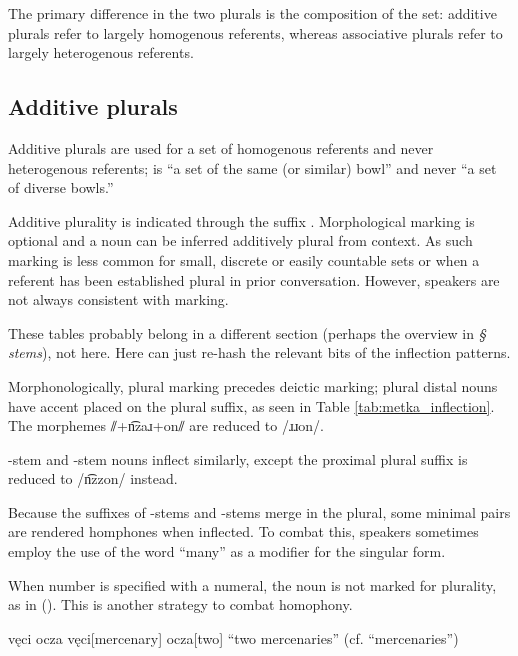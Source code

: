 The primary difference in the two plurals is the composition of the set: additive plurals refer to largely homogenous referents, whereas associative plurals refer to largely heterogenous referents.

\subsection{Additive plurals}
Additive plurals are used for a set of homogenous referents and never heterogenous referents; \eg {} is “a set of the same (or similar) bowl” and never “a set of diverse bowls.”

Additive plurality is indicated through the suffix . Morphological marking is optional and a noun can be inferred additively plural from context.  As such marking is less common for small, discrete or easily countable sets or when a referent has been established plural in prior conversation. However, speakers are not always consistent with marking.

\begin{kaobox}[frametitle=\sc todo:]
    These tables probably belong in a different section (perhaps the overview in \emph{§ stems}), not here. Here can just re-hash the relevant bits of the inflection patterns.
\end{kaobox}

Morphonologically, plural marking precedes deictic marking; plural distal nouns have accent placed on the plural suffix, as seen in Table \ref{tab:metka_inflection}. The morphemes ⫽+n͡zaɹ+on⫽ are reduced to /ɹɹon/.

-stem and -stem nouns inflect similarly, except the proximal plural suffix is reduced to /n͡zzon/ instead.

Because the suffixes of -stems and -stems merge in the plural, some minimal pairs are rendered homphones when inflected. To combat this, speakers sometimes employ the use of the word  “many” as a modifier for the singular form.

When number is specified with a numeral, the noun is not marked for plurality, as in (\nextx). This is another strategy to combat homophony.

\ex \begingl
\glpreamble vęci ocza \endpreamble
vęci[mercenary]
ocza[two]
\glft “two mercenaries”
\trailingcitation (cf.  “mercenaries”)
\endgl \xe

